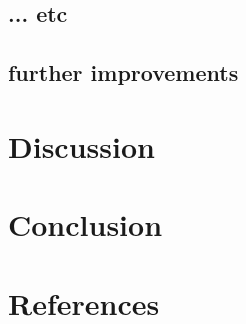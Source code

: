 \documentclass{article}
\begin{document}
\subsection{... etc}

\subsection{further improvements}

\section{Discussion}

\section{Conclusion}

\section{References}
\end{document}
